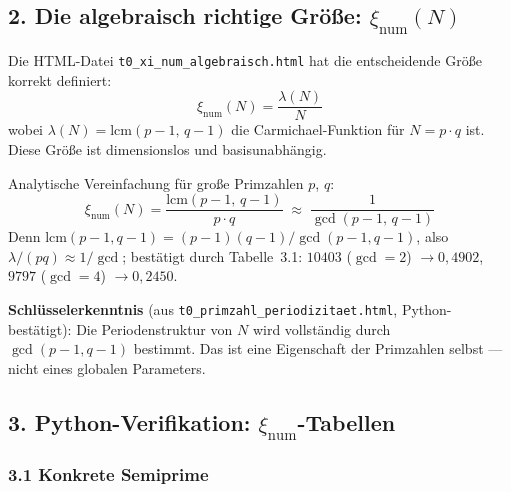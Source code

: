 \subsection*{2. Die algebraisch richtige Größe: $\xi_\text{num}(N)$}

Die HTML-Datei \texttt{t0\_xi\_num\_algebraisch.html} hat die entscheidende
Größe korrekt definiert:
\[
\xi_\text{num}(N) = \frac{\lambda(N)}{N}
\]
wobei $\lambda(N) = \text{lcm}(p-1,\, q-1)$ die Carmichael-Funktion für
$N = p \cdot q$ ist. Diese Größe ist dimensionslos und basisunabhängig.

Analytische Vereinfachung für große Primzahlen $p$, $q$:
\[
\xi_\text{num}(N) = \frac{\text{lcm}(p-1,\, q-1)}{p \cdot q}
\;\approx\; \frac{1}{\gcd(p-1,\, q-1)}
\]
Denn $\text{lcm}(p-1,q-1) = (p-1)(q-1)/\gcd(p-1,q-1)$, also $\lambda/(pq) \approx 1/\gcd$;
bestätigt durch Tabelle~3.1: $10403$ ($\gcd = 2$) $\to 0{,}4902$, $9797$ ($\gcd = 4$) $\to 0{,}2450$.

\begin{mdframed}[style=ok]
\textbf{Schlüsselerkenntnis} (aus \texttt{t0\_primzahl\_periodizitaet.html},
Python-bestätigt): Die Periodenstruktur von $N$ wird vollständig durch
$\gcd(p-1, q-1)$ bestimmt. Das ist eine Eigenschaft der Primzahlen selbst —
nicht eines globalen Parameters.
\end{mdframed}

\subsection*{3. Python-Verifikation: $\xi_\text{num}$-Tabellen}

\subsubsection*{3.1 Konkrete Semiprime}

\begin{center}
\end{center}

